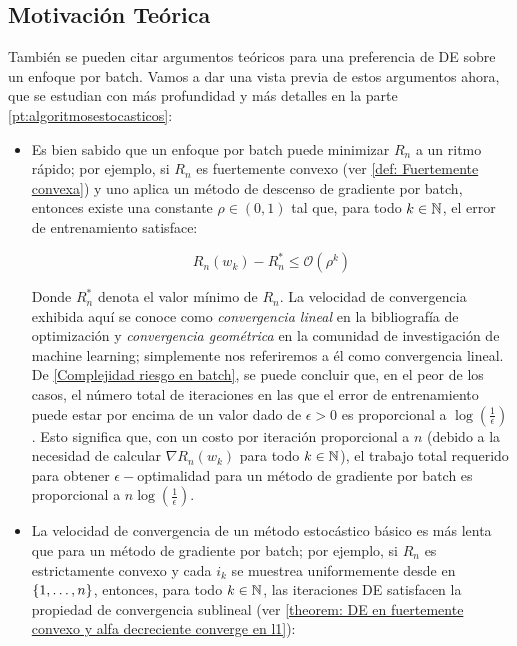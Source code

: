 \subsection{Motivación Teórica }

También se pueden citar argumentos teóricos para una preferencia de DE sobre un enfoque por batch. Vamos a dar una vista previa de estos argumentos ahora, que se estudian con más profundidad y más detalles en la parte \ref{pt:algoritmosestocasticos}:

\begin{itemize}
	\item Es bien sabido que un enfoque por batch puede minimizar $R_n$ a un ritmo rápido; por ejemplo, si $R_n$ es fuertemente convexo (ver \ref{def: Fuertemente convexa}) y uno aplica un método de descenso de gradiente por batch, entonces existe una constante $\rho \in (0,1)$ tal que, para todo $k \in {\mathbb{N}}$, el error de entrenamiento satisface:
	
	\begin{equation}
		\label{Complejidad riesgo en batch}
		R_n(w_k) - R_n^* \leq \mathcal{O} \left(\rho^k\right)
	\end{equation}
	
	Donde $R_n^*$ denota el valor mínimo de $R_n$. La velocidad de convergencia exhibida aquí se conoce como \textit{convergencia lineal} en la bibliograf\'ia de optimización \cite{ortega:2000} y \textit{convergencia geométrica} en la comunidad de investigación de machine learning; simplemente nos referiremos a él como convergencia lineal. De \ref{Complejidad riesgo en batch}, se puede concluir que, en el peor de los casos, el número total de iteraciones en las que el error de entrenamiento puede estar por encima de un valor dado de $\epsilon >0$ es proporcional a $\log \left(\frac{1}{\epsilon}\right)$. Esto significa que, con un costo por iteración proporcional a $n$ (debido a la necesidad de calcular $\nabla R_n(w_k)$ para todo $k \in {\mathbb{N}}$), el trabajo total requerido para obtener $\epsilon-$optimalidad para un método de gradiente por batch es proporcional a $n \log\left(\frac{1}{\epsilon}\right)$.
	
	\item La velocidad de convergencia de un método estocástico básico es más lenta que para un método de gradiente por batch; por ejemplo, si $R_n$ es estrictamente convexo y cada $i_k$ se muestrea uniformemente desde en $\left\lbrace1, \dots, n\right\rbrace$, entonces, para todo $k \in {\mathbb{N}}$, las iteraciones DE satisfacen la propiedad de convergencia sublineal (ver \ref{theorem: DE en fuertemente convexo y alfa decreciente converge en l1}):
	

\end{itemize}
